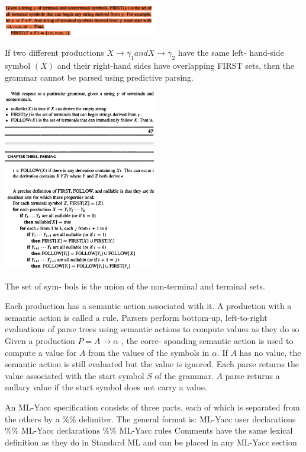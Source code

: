 \documentclass[8pt, a4paper, oneside, twocolumn]{extarticle}
\begin{document}
\includegraphics[width=0.5\textwidth,height=0.5\textheight,keepaspectratio]{first}

If two different productions $X \rightarrow \gamma_1 and X \rightarrow \gamma_2$ have the same left-
hand-side symbol $(X)$ and their right-hand sides have overlapping FIRST
sets, then the grammar cannot be parsed using predictive parsing.

\includegraphics[width=0.5\textwidth,height=0.5\textheight,keepaspectratio]{follow}

The set of sym-
bols is the union of the non-terminal and terminal sets. 

Each production
has a semantic action associated with it.  A production with a semantic action is called a
rule.  Parsers perform bottom-up, left-to-right evaluations of parse trees using semantic
actions to compute values as they do so
Given a production $P = A \rightarrow \alpha$
, the corre-
sponding semantic action is used to compute a value for $A$
from the values of the symbols
in $\alpha$.  If
$A$
has no value, the semantic action is still evaluated but the value is ignored.
Each  parse  returns  the  value  associated  with  the  start  symbol
$S$
of  the  grammar. $A$
parse returns a nullary value if the start symbol does not carry a value.

An ML-Yacc specification consists of three parts, each of which is separated from the
others by a \%\% delimiter.  The general format is:
ML-Yacc user declarations
\%\%
ML-Yacc declarations
\%\%
ML-Yacc rules
Comments have the same lexical definition as they do in Standard ML and can be
placed in any ML-Yacc section
\end{document}
